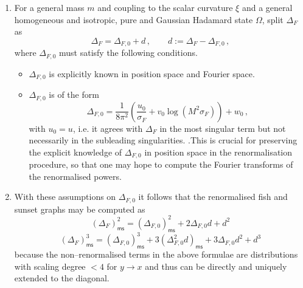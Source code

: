 \documentclass[10pt]{book}
\newcommand{\ms}{\mathsf{ms}}
\theoremstyle{break}
\begin{document}
\begin{enumerate}
\item For a general mass $m$ and coupling to the scalar curvature $\xi$ and a general homogeneous and isotropic, pure and Gaussian Hadamard state $\Omega$, split $\Delta_F$ as
\begin{equation*}%
\Delta_F=\Delta_{F,0}+d\,,\qquad d:=\Delta_F-\Delta_{F,0}\,,\end{equation*}
where $\Delta_{F,0}$ must satisfy the following conditions.
\begin{itemize}
\item $\Delta_{F,0}$ is explicitly known in position space and Fourier space.
\item $\Delta_{F,0}$ is of the form
$$\Delta_{F,0}=\frac{1}{8\pi^2}\left(\frac{u_0}{\sigma_F}+v_0\log \left(M^2\sigma_F\right)\right)+w_0\,,$$
with $u_0=u$, i.e. it agrees with $\Delta_F$ in the most singular term but not necessarily in the subleading singularities.
.This is crucial for preserving the explicit knowledge of $\Delta_{F,0}$ in position space in the renormalisation procedure, so that one may hope to compute the Fourier transforms of the renormalised powers.
\end{itemize}

\item With these assumptions on $\Delta_{F,0}$ it follows that the renormalised fish and sunset graphs may be computed as
\begin{equation*}%
(\Delta_{F})^2_\ms = (\Delta_{F,0})^2_\ms + 2 \Delta_{F,0} d+ d^2\end{equation*}
$$(\Delta_{F})^3_\ms = (\Delta_{F,0})^3_\ms + 3 \left(\Delta^2_{F,0} d\right)_\ms+ 3  \Delta_{F,0} d^2+ d^3$$
because the non--renormalised terms in the above formulae are distributions with scaling degree $<4$ for $y\to x$ and thus can be directly and uniquely extended to the diagonal.


\end{enumerate}
\end{document}
